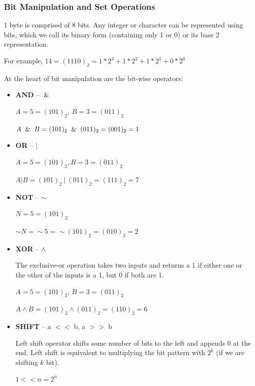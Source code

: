 \documentclass{article}
\begin{document}
    \subsubsection{Bit Manipulation and Set Operations}
    1 byte is comprised of 8 bits. Any integer or character can be represented using bits, which we call its binary form (containing only 1 or 0) or its base 2 representation.
    
    For example, $14 = (1110)_2 = 1 * 2^3 + 1 * 2^2 + 1 * 2^1 + 0 * 2^0$  
    
    At the heart of bit manipulation are the bit-wise operators: 
    \begin{itemize}
        \item \textbf{AND} -- $\And$ 
        
        $A = 5 = (101)_2$, $B = 3 = (011)_2$

        $A \And B = (101)_2  \And (011)_2 = (001)_2 = 1$
        
        \item \textbf{OR} -- $\vert$ 
        
        $A = 5 = (101)_2 , B = 3 = (011)_2$
        
        $A \vert B = (101)_2 \  \vert \ (011)_2 = (111)_2 = 7$
        
        \item\textbf{NOT} -- $\sim$ 
        
        $N = 5 = (101)_2$
        
        $\sim N = \sim 5 = \sim (101)_2 = (010)_2 = 2$
        
        \item \textbf{XOR} -- $\wedge$ 
        
        The exclusive-or operation takes two inputs and returns a 1 if either one or the other of the inputs is a 1, but 0 if both are 1.
        
        $A = 5 = (101)_2$, $B = 3 = (011)_2$
        
        $A \wedge B = (101)_2 \wedge (011)_2 = (110)_2 = 6$
        
        \item  \textbf{SHIFT} -- a $<<$ b, a $>>$ b
        
        Left shift operator shifts some number of bits to the left and appends 0 at the end. Left shift is equivalent to multiplying the bit pattern with $2^k$ (if we are shifting $k$ bit).
        
        $1 << n = 2^n$
        

\end{itemize}
\end{document}
